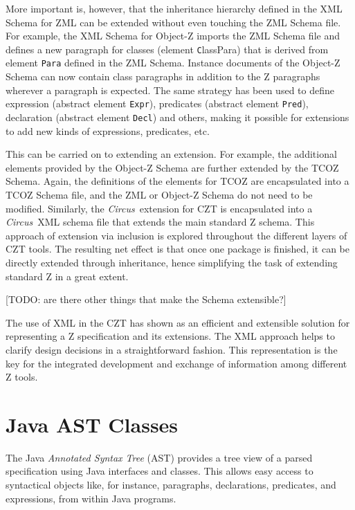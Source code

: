 \documentclass{llncs}
\newcommand{\Circus}{{\sf\slshape Circus}}
\newcommand{\Element}[1]{\texttt{#1}}
\begin{document}
  More important is, however, that the inheritance hierarchy defined
  in the XML Schema for ZML can be extended without even touching the
  ZML Schema file.  For example, the XML Schema for Object-Z imports
  the ZML Schema file and defines a new paragraph for classes (element
  \Element ClassPara) that is derived from element \Element{Para}
  defined in the ZML Schema.  Instance documents of the Object-Z
  Schema can now contain class paragraphs in addition to the Z
  paragraphs wherever a paragraph is expected.  The same strategy has
  been used to define expression (abstract element \Element{Expr}),
  predicates (abstract element \Element{Pred}), declaration (abstract
  element \Element{Decl}) and others, making it possible for
  extensions to add new kinds of expressions, predicates, etc.

  This can be carried on to extending an extension.  For example, the
  additional elements provided by the Object-Z Schema are further
  extended by the TCOZ Schema.  Again, the definitions of the elements
  for TCOZ are encapsulated into a TCOZ Schema file, and the ZML or
  Object-Z Schema do not need to be modified.
  Similarly, the \Circus\ extension for CZT is encapsulated into a
  \Circus\ XML schema file that extends the main standard Z schema.
  This approach of extension via inclusion is explored throughout the
  different layers of CZT tools.
  The resulting net effect is that once one package is finished, it
  can be directly extended through inheritance, hence simplifying the
  task of extending standard Z in a great extent.

  [TODO: are there other things that make the Schema extensible?]

  The use of XML in the CZT has shown as an efficient and extensible
  solution for representing a Z specification and its extensions.  The
  XML approach helps to clarify design decisions in a straightforward
  fashion.  This representation is the key for the integrated
  development and exchange of information among different Z tools.

\section{Java AST Classes}\label{java-ast-classes}

  The Java \emph{Annotated Syntax Tree} (AST) provides a tree view of
  a parsed specification using Java interfaces and classes.  This
  allows easy access to syntactical objects like, for instance,
  paragraphs, declarations, predicates, and expressions, from within
  Java programs.
\end{document}
